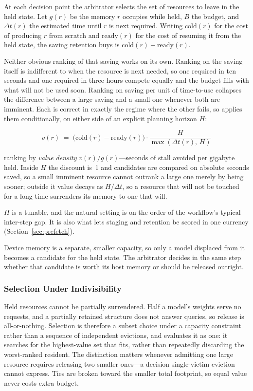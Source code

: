 At each decision point the arbitrator selects the set of resources to leave in
the held state. Let $g(r)$ be the memory $r$ occupies while held, $B$ the
budget, and $\Delta t(r)$ the estimated time until $r$ is next required.
Writing $\mathrm{cold}(r)$ for the cost of producing $r$ from scratch and
$\mathrm{ready}(r)$ for the cost of resuming it from the held state, the
saving retention buys is $\mathrm{cold}(r) - \mathrm{ready}(r)$.

Neither obvious ranking of that saving works on its own. Ranking on the saving
itself is indifferent to when the resource is next needed, so one required in
ten seconds and one required in three hours compete equally and the budget
fills with what will not be used soon. Ranking on saving per unit of
time-to-use collapses the difference between a large saving and a small one
whenever both are imminent. Each is correct in exactly the regime where the
other fails, so \sysname{} applies them conditionally, on either side of an
explicit planning horizon $H$:

\begin{equation}
v(r) \;=\; \bigl(\mathrm{cold}(r) - \mathrm{ready}(r)\bigr)
           \cdot \frac{H}{\max\!\left(\Delta t(r),\, H\right)}
\label{eq:value}
\end{equation}

\noindent ranking by \emph{value density} $v(r)/g(r)$---seconds of stall
avoided per gigabyte held. Inside $H$ the discount is~1 and candidates are
compared on absolute seconds saved, so a small imminent resource cannot
outrank a large one merely by being sooner; outside it value decays as
$H/\Delta t$, so a resource that will not be touched for a long time surrenders
its memory to one that will.

$H$ is a tunable, and the natural setting is on the order of the workflow's
typical inter-step gap. It is also what lets staging and retention be scored
in one currency (Section~\ref{sec:prefetch}).

Device memory is a separate, smaller capacity, so only a model displaced from
it becomes a candidate for the held state. The arbitrator decides in the same
step whether that candidate is worth its host memory or should be released
outright.

\subsubsection{Selection Under Indivisibility}


Held resources cannot be partially surrendered. Half a model's weights serve
no requests, and a partially retained structure does not answer queries, so
release is all-or-nothing. Selection is therefore a subset choice under a
capacity constraint rather than a sequence of independent evictions, and
\sysname{} evaluates it as one: it searches for the highest-value set that fits,
rather than repeatedly discarding the worst-ranked resident. The distinction
matters whenever admitting one large resource requires releasing two smaller
ones---a decision single-victim eviction cannot express. Ties are broken
toward the smaller total footprint, so equal value never costs extra budget.


